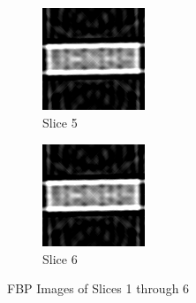 \documentclass{article}
\begin{document}
\begin{figure}[t!]
\medskip
\begin{subfigure}{0.45\textwidth}
\includegraphics[width=\linewidth]{s_05.png}
\caption{Slice 5} \label{fig:e}
\end{subfigure}\hspace*{\fill}
\begin{subfigure}{0.45\textwidth}
\includegraphics[width=\linewidth]{s_06.png}
\caption{Slice 6} \label{fig:f}
\end{subfigure}

\caption{FBP Images of Slices 1 through 6} \label{fig:1}
\end{figure}
\end{document}
